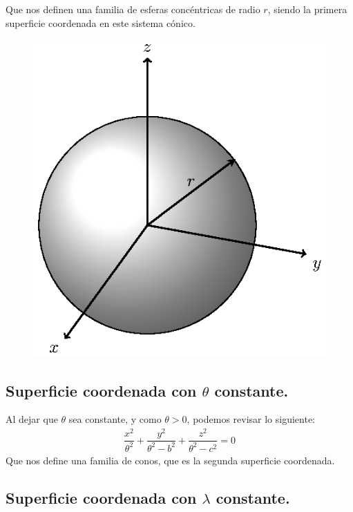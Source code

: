 Que nos definen una familia de esferas concéntricas de radio $r$, siendo la primera superficie coordenada en este sistema cónico.

\begin{figure}[H]
  \centering
  \includegraphics[scale=1]{Imagenes/Sistema_Conico_Superficie_Constante_01.eps}
\end{figure}

\subsection*{Superficie coordenada con \texorpdfstring{$\theta$}{t} constante.}
Al dejar que $\theta$ sea constante, y como $\theta > 0$, podemos revisar lo siguiente:
\begin{align*}
\dfrac{x^{2}}{\theta^{2}} + \dfrac{y^{2}}{\theta^{2} - b^{2}} + \dfrac{z^{2}}{\theta^{2} - c^{2}} = 0
\end{align*}
Que nos define una familia de conos, que es la segunda superficie coordenada.

\subsection*{Superficie coordenada con \texorpdfstring{$\lambda$}{l} constante.}

